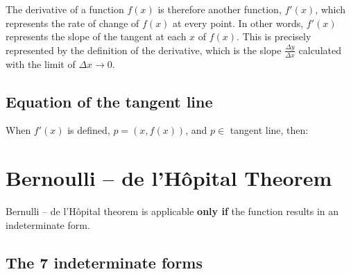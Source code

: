 \documentclass{article}
\begin{document}
\begin{minipage}{0.5\textwidth}
\end{minipage}
\begin{minipage}{0.5\textwidth}
The derivative of a function \(f(x)\) is therefore another function, \(f'(x)\), which
represents the rate of change of \(f(x)\) at every point. In other words, \(f'(x)\)
represents the slope of the tangent at each \(x\) of \(f(x)\).
This is precisely represented by the definition of the derivative, which is the slope
\(\frac{\Delta y}{\Delta x}\) calculated with the limit of \(\Delta x \to 0\).
\end{minipage}

\subsection{Equation of the tangent line}
When $f'(x)$ is defined, $p = \left(x, f(x)\right)$, and $p \in$ tangent line, then:

\section{Bernoulli -- de l'Hôpital Theorem}
Bernulli -- de l'Hôpital theorem is applicable \textbf{only if} the function
results in an indeterminate form.

\subsection{The 7 indeterminate forms}
\end{document}
